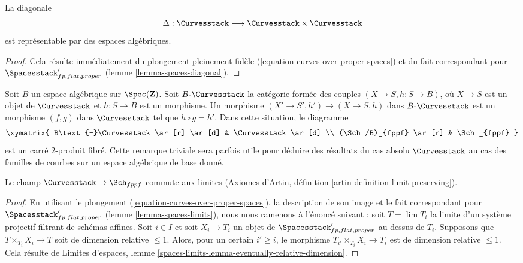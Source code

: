 \begin{lemma}
\label{lemma-curves-diagonal}
La diagonale
$$
\Delta : \Curvesstack \longrightarrow \Curvesstack \times \Curvesstack
$$
est représentable par des espaces algébriques.
\end{lemma}

\begin{proof}
Cela résulte immédiatement du plongement pleinement fidèle
(\ref{equation-curves-over-proper-spaces}) et du fait correspondant pour
$\Spacesstack'_{fp, flat, proper}$
(lemme \ref{lemma-spaces-diagonal}).
\end{proof}

\begin{remark}
\label{remark-curves-base-change}
Soit $B$ un espace algébrique sur $\Spec(\mathbf{Z})$.
Soit $B\text{-}\Curvesstack$ la catégorie formée des couples
$(X \to S, h : S \to B)$, où $X \to S$ est un objet de $\Curvesstack$ et
$h : S \to B$ est un morphisme.
Un morphisme $(X' \to S', h') \to (X \to S, h)$ dans
$B\text{-}\Curvesstack$ est un morphisme $(f, g)$ dans $\Curvesstack$ tel que
$h \circ g = h'$.
Dans cette situation, le diagramme
$$
\xymatrix{
B\text{-}\Curvesstack \ar[r] \ar[d] & \Curvesstack \ar[d] \\
(\Sch/B)_{fppf} \ar[r] & \Sch_{fppf}
}
$$
est un carré $2$-produit fibré. Cette remarque triviale sera parfois utile
pour déduire des résultats du cas absolu $\Curvesstack$ au cas des familles de
courbes sur un espace algébrique de base donné.
\end{remark}

\begin{lemma}
\label{lemma-curves-limits}
Le champ $\Curvesstack \to \Sch_{fppf}$ commute aux limites
(Axiomes d'Artin, définition \ref{artin-definition-limit-preserving}).
\end{lemma}

\begin{proof}
En utilisant le plongement (\ref{equation-curves-over-proper-spaces}),
la description de son image et le fait correspondant pour
$\Spacesstack'_{fp, flat, proper}$ (lemme \ref{lemma-spaces-limits}),
nous nous ramenons à l'énoncé suivant :
soit $T = \lim T_i$ la limite d'un système projectif filtrant de schémas
affines. Soit $i \in I$ et soit $X_i \to T_i$ un objet de
$\Spacesstack'_{fp, flat, proper}$ au-dessus de $T_i$.
Supposons que $T \times_{T_i} X_i \to T$ soit de dimension relative
$\leq 1$. Alors, pour un certain $i' \geq i$, le morphisme
$T_{i'} \times_{T_i} X_i \to T_i$ est de dimension relative $\leq 1$.
Cela résulte de Limites d'espaces, lemme
\ref{spaces-limits-lemma-eventually-relative-dimension}.
\end{proof}

